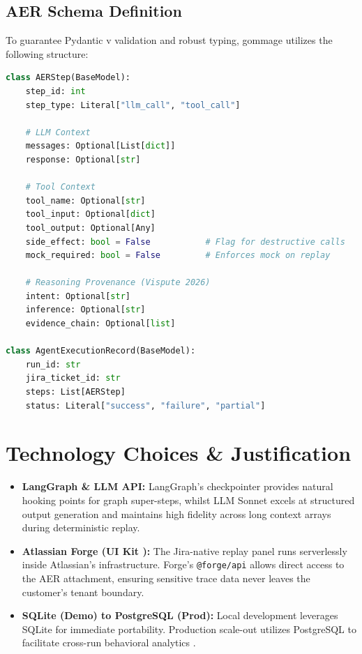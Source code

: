 \documentclass[11pt, a4paper]{article}
\begin{document}
\subsection{AER Schema Definition}
To guarantee Pydantic v \rmfamily validation and robust typing, gommage utilizes the following structure:

\begin{lstlisting}[language=Python]
class AERStep(BaseModel):
    step_id: int
    step_type: Literal["llm_call", "tool_call"]
    
    # LLM Context
    messages: Optional[List[dict]]      
    response: Optional[str]             
    
    # Tool Context
    tool_name: Optional[str]
    tool_input: Optional[dict]
    tool_output: Optional[Any]
    side_effect: bool = False           # Flag for destructive calls
    mock_required: bool = False         # Enforces mock on replay
    
    # Reasoning Provenance (Vispute 2026)
    intent: Optional[str]              
    inference: Optional[str]           
    evidence_chain: Optional[list]     

class AgentExecutionRecord(BaseModel):
    run_id: str
    jira_ticket_id: str
    steps: List[AERStep]
    status: Literal["success", "failure", "partial"]
\end{lstlisting}

\section{Technology Choices \& Justification}

\begin{itemize}[leftmargin=1.5em, itemsep=0.5em]
  \item \textbf{LangGraph \& LLM API:} LangGraph's checkpointer provides natural hooking points for graph super-steps, whilst LLM Sonnet excels at structured output generation and maintains high fidelity across long context arrays during deterministic replay.
  \item \textbf{Atlassian Forge (UI Kit \rmfamily):} The Jira-native replay panel runs serverlessly inside Atlassian's infrastructure. Forge's \texttt{@forge/api} allows direct access to the AER attachment, ensuring sensitive trace data never leaves the customer's tenant boundary.
  \item \textbf{SQLite (Demo) to PostgreSQL (Prod):} Local development leverages SQLite for immediate portability. Production scale-out utilizes PostgreSQL to facilitate cross-run behavioral analytics \cite{vispute2026}.
\end{itemize}
\end{document}
